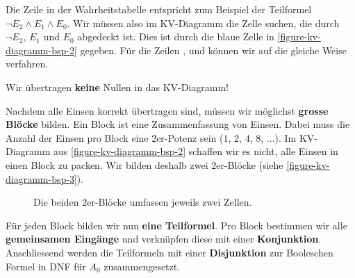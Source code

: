\begin{example}
Die Zeile  in der Wahrheitstabelle entspricht zum Beispiel der Teilformel $\neg E_2 \wedge E_1 \wedge E_0$. Wir müssen also im \acs{KV}-Diagramm die Zelle suchen, die durch $\neg E_2$, $E_1$ und $E_0$ abgedeckt ist. Dies ist durch die blaue Zelle in \autoref{figure-kv-diagramm-bsp-2} gegeben. Für die Zeilen ,  und  können wir auf die gleiche Weise verfahren.

\begin{important}
Wir übertragen \textbf{keine} Nullen in das \ac{KV}-Diagramm!
\end{important}

Nachdem alle Einsen korrekt übertragen sind, müssen wir möglichst \textbf{grosse Blöcke} bilden. Ein Block ist eine Zusammenfassung von Einsen. Dabei muss die Anzahl der Einsen pro Block eine $2$er-Potenz sein ($1$, $2$, $4$, $8$, $\dots$). Im \ac{KV}-Diagramm aus \autoref{figure-kv-diagramm-bsp-2} schaffen wir es nicht, alle Einsen in einen Block zu packen. Wir bilden deshalb zwei $2$er-Blöcke (siehe \autoref{figure-kv-diagramm-bsp-3}).

\begin{figure}[htb]
\centering
{}
\caption{Die beiden $2$er-Blöcke umfassen jeweils zwei Zellen.}
\label{figure-kv-diagramm-bsp-3}
\end{figure}

\newpage

Für jeden Block bilden wir nun \textbf{eine Teilformel}. Pro Block bestimmen wir alle \textbf{gemeinsamen Eingänge} und verknüpfen diese mit einer \textbf{Konjunktion}. Anschliessend werden die Teilformeln mit einer \textbf{Disjunktion} zur Booleschen Formel in \ac{DNF} für $A_0$ zusammengesetzt.


\end{example}
